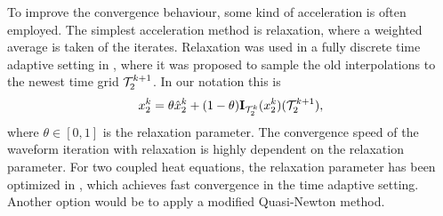 To improve the convergence behaviour, some kind of acceleration is often employed. The simplest acceleration method is relaxation, where a weighted  average is taken of the iterates. Relaxation was used in a fully discrete time adaptive setting in \cite{BiMeMo23}, where it was proposed to sample the old interpolations to the newest time grid ${\cal T}_{2}^{k+1}$. In our notation this is 
\begin{align*}
	x_2^k = \theta \hat{x}_2^k + (1 - \theta)\mathbf{I}_{\mathcal{T}_2^k}(x_2^{k})({\cal T}_{2}^{k+1}),
\end{align*}
where $\theta \in [0,1]$ is the relaxation parameter. The convergence speed of the waveform iteration with relaxation is highly dependent on the relaxation parameter. For two coupled heat equations, the relaxation parameter has been optimized in \cite{BiMo18}, which achieves fast convergence in the time adaptive setting. Another option would be to apply a modified Quasi-Newton method. 

